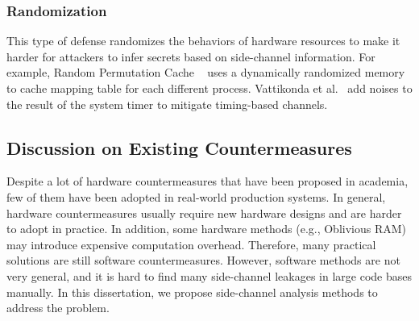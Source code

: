 \subsubsection*{Randomization}
This type of defense randomizes the behaviors of hardware resources to make it harder for attackers to infer secrets based on side-channel information. For example, Random Permutation Cache ~\cite{wang2007new} uses a dynamically randomized memory to cache mapping table for each different process. Vattikonda et al.~\cite{vattikonda2011eliminating} add noises to the result of the system timer to mitigate timing-based channels.

\subsection{Discussion on Existing Countermeasures}
Despite a lot of hardware countermeasures that have been proposed in academia, few of them have been adopted in real-world production systems. In general, hardware countermeasures usually require new hardware designs and are harder to adopt in practice.  In addition, some hardware methods (e.g., Oblivious RAM) may introduce expensive computation overhead. Therefore, many practical solutions are still software countermeasures. However, software methods are not very general, and it is hard to find many side-channel leakages in large code bases manually. In this dissertation, we propose side-channel analysis methods to address the problem.
